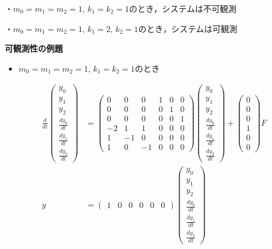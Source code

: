\documentclass[a4paper,11pt,fleqn]{jreport}
\begin{document}
・$m_0=m_1=m_2=1$, $k_1=k_2=1$のとき，システムは不可観測

・$m_0=m_1=m_2=1$, $k_1=2$, $k_2=1$のとき，システムは可観測

\newpage
\noindent
{\bf 可観測性の例題}

\begin{itemize}
\item $m_0=m_1=m_2=1$, $k_1=k_2=1$のとき
\end{itemize}
\begin{align}
 \frac{d}{dt} \left(\begin{array}{c}
	         y_0 \\
		     y_1 \\
		     y_2 \\
		     \frac{dy_0}{dt} \\
		     \frac{dy_1}{dt} \\
		     \frac{dy_2}{dt}
		    \end{array}\right)
 &=
 \left(\begin{array}{rrrrrr}
        0 & 0 & 0 & 1 & 0 & 0      \\
        0 & 0 & 0 & 0 & 1 & 0      \\
        0 & 0 & 0 & 0 & 0 & 1      \\
	-2& 1 & 1 & 0 & 0 & 0 \\
	1 & -1& 0 & 0 & 0 & 0 \\
	1 & 0 & -1& 0 & 0 & 0 
       \end{array}\right)
 \left(\begin{array}{c}
	         y_0 \\
		     y_1 \\
		     y_2 \\
		     \frac{dy_0}{dt} \\
		     \frac{dy_1}{dt} \\
		     \frac{dy_2}{dt}
       \end{array}\right)
 +
 \left(\begin{array}{c}
        0 \\
        0 \\
        0 \\
	    1 \\
	    0 \\
	    0 
       \end{array}\right)
        F
\nonumber
\\
y &=
 \left(\begin{array}{cccccc}
         1 & 0 & 0 & 0 & 0 & 0
       \end{array}\right)
 \left(\begin{array}{c}
	         y_0 \\
		     y_1 \\
		     y_2 \\
		     \frac{dy_0}{dt} \\
		     \frac{dy_1}{dt} \\
		     \frac{dy_2}{dt}
       \end{array}\right)
\nonumber
\end{align}
\end{document}
